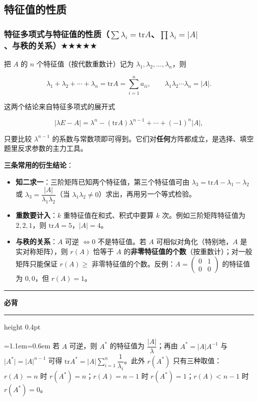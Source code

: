 \documentclass[11pt,openany,UTF8]{ctexbook}
\newcommand{\callouthead}[2]{%
  \par\addvspace{7pt}\noindent
  {\color{#1}\rule[-0.15em]{3pt}{1.05em}}\hspace{0.5em}%
  {\bfseries\color{#1}#2}\par\nobreak\vspace{-0.35em}%
  {\color{rulesep}\hrule height 0.4pt}\nobreak\vspace{0.45em}%
  \begingroup\small\setlength{\parindent}{0pt}%
  \leftskip=1.1em\rightskip=0.6em\noindent\ignorespaces}
\newcommand{\calloutend}{\par\endgroup\addvspace{7pt}}
\newenvironment{callkey}[1]{\callouthead{keybar}{#1}}{\calloutend}
\begin{document}
\subsection{特征值的性质}

\subsubsection{特征多项式与特征值的性质（$\sum\lambda_i=\mathrm{tr}A$、$\prod\lambda_i=\vert A\vert$、与秩的关系）$\bigstar$$\bigstar$$\bigstar$$\bigstar$$\bigstar$}

把 $A$ 的 $n$ 个特征值（按代数重数计）记为 $\lambda_1,\lambda_2,\dots,\lambda_n$，则

\[\lambda_1+\lambda_2+\cdots+\lambda_n=\mathrm{tr}A=\sum_{i=1}^{n}a_{ii},\qquad \lambda_1\lambda_2\cdots\lambda_n=\vert A\vert .\]

这两个结论来自特征多项式的展开式

\[\vert\lambda E-A\vert=\lambda^n-(\mathrm{tr}A)\lambda^{n-1}+\cdots+(-1)^n\vert A\vert,\]

只要比较 $\lambda^{n-1}$ 的系数与常数项即可得到。它们对\textbf{任何}方阵都成立，是选择、填空题里反求参数的主力工具。

\textbf{三条常用的衍生结论}：

\begin{itemize}
\item \textbf{知二求一}：三阶矩阵已知两个特征值，第三个特征值可由 $\lambda_3=\mathrm{tr}A-\lambda_1-\lambda_2$ 或 $\lambda_3=\dfrac{\vert A\vert}{\lambda_1\lambda_2}$（当 $\lambda_1\lambda_2\neq0$）求出，再用另一个等式检验。
\item \textbf{重数要计入}：$k$ 重特征值在和式、积式中要算 $k$ 次。例如三阶矩阵特征值为 $2,2,1$，则 $\mathrm{tr}A=5$，$\vert A\vert=4$。
\item \textbf{与秩的关系}：$A$ 可逆 $\iff0$ 不是特征值。若 $A$ 可相似对角化（特别地，$A$ 是实对称矩阵），则 $r(A)$ 恰等于 $A$ 的\textbf{非零特征值的个数}（按重数计）；对一般矩阵只能保证 $r(A)\geq$ 非零特征值的个数。反例：$A=\begin{pmatrix}0&1\\0&0\end{pmatrix}$ 的特征值为 $0,0$，但 $r(A)=1$。
\end{itemize}
\begin{callkey}{必背}
若 $A$ 可逆，则 $A^*$ 的特征值为 $\dfrac{\vert A\vert}{\lambda}$；再由 $A^*=\vert A\vert A^{-1}$ 与 $\vert A^*\vert=\vert A\vert^{n-1}$ 可得 $\mathrm{tr}A^*=\vert A\vert\sum\limits_{i=1}^{n}\dfrac{1}{\lambda_i}$。此外 $r(A^*)$ 只有三种取值：$r(A)=n$ 时 $r(A^*)=n$；$r(A)=n-1$ 时 $r(A^*)=1$；$r(A)<n-1$ 时 $r(A^*)=0$。

\end{callkey}
\end{document}
